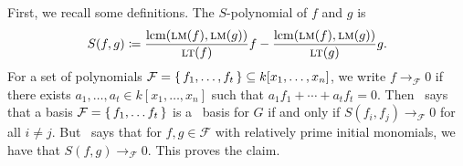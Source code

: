 \documentclass[letterpaper, 11pt, oneside]{book}
\begin{document}
\begin{sol}
  First, we recall some definitions.
  The $S$-polynomial of $f$ and $g$ is
  \[
    S(f, g) \coloneqq \frac{\operatorname{lcm}(\operatorname{\textsc{lm}}(f), \operatorname{\textsc{lm}}(g))}{\operatorname{\textsc{lt}}(f)} f - \frac{\operatorname{lcm}(\operatorname{\textsc{lm}}(f), \operatorname{\textsc{lm}}(g))}{\operatorname{\textsc{lt}}(g)} g.
  \]
  For a set of polynomials $\mathcal{F} = \set{f_{1}, \ldots, f_{t}} \subseteq k[x_{1}, \ldots, x_{n}]$, we write $f \to_{\mathcal{F}} 0$ if there exists $a_{1}, \ldots, a_{t} \in k[x_{1}, \ldots, x_{n}]$ such that $a_{1} f_{1} + \cdots + a_{t} f_{t} = 0$.
  Then~\cite[Chapter 2, \S 9, Theorem 3]{book:IVA} says that a basis $\mathcal{F} = \set{f_{1}, \ldots f_{t}}$ is a \Grobner\ basis for $G$ if and only if $S(f_{i}, f_{j}) \to_{\mathcal{F}} 0$ for all $i \neq j$.
  But~\cite[Chapter 2, \S 9, Proposition 4]{book:IVA} says that for $f, g \in \mathcal{F}$ with relatively prime initial monomials, we have that $S(f, g) \to_{\mathcal{F}} 0$.
  This proves the claim.
\end{sol}

\printbibliography
\end{document}
